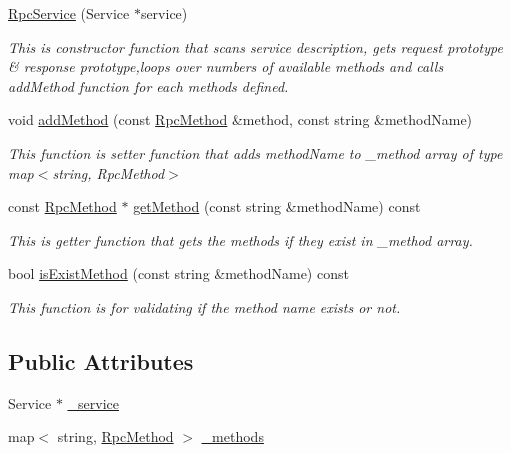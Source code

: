\begin{DoxyCompactItemize}
\item 
\hyperlink{classcoappbrpc_1_1RpcService_a66c75fc19a62dbf650f4dc5080d15bfa}{Rpc\+Service} (Service $\ast$service)
\begin{DoxyCompactList}\small\item\em This is constructor function that scans service description, gets request prototype \& response prototype,loops over numbers of available methods and calls add\+Method function for each methods defined. \end{DoxyCompactList}\item 
\mbox{\label{classcoappbrpc_1_1RpcService_a3cb969b5056dc0d5264552a16c1d244f}} 
void \hyperlink{classcoappbrpc_1_1RpcService_a3cb969b5056dc0d5264552a16c1d244f}{add\+Method} (const \hyperlink{classcoappbrpc_1_1RpcMethod}{Rpc\+Method} \&method, const string \&method\+Name)
\begin{DoxyCompactList}\small\item\em This function is setter function that adds method\+Name to \+\_\+method array of type map$<$string, Rpc\+Method$>$ \end{DoxyCompactList}\item 
\mbox{\label{classcoappbrpc_1_1RpcService_afdbb7a187c602fc830c5b3101e6b2e35}} 
const \hyperlink{classcoappbrpc_1_1RpcMethod}{Rpc\+Method} $\ast$ \hyperlink{classcoappbrpc_1_1RpcService_afdbb7a187c602fc830c5b3101e6b2e35}{get\+Method} (const string \&method\+Name) const
\begin{DoxyCompactList}\small\item\em This is getter function that gets the methods if they exist in \+\_\+method array. \end{DoxyCompactList}\item 
\mbox{\label{classcoappbrpc_1_1RpcService_a0c7f4041e49a3d4e0abd6eb9aad9691d}} 
bool \hyperlink{classcoappbrpc_1_1RpcService_a0c7f4041e49a3d4e0abd6eb9aad9691d}{is\+Exist\+Method} (const string \&method\+Name) const
\begin{DoxyCompactList}\small\item\em This function is for validating if the method name exists or not. \end{DoxyCompactList}\end{DoxyCompactItemize}
\subsection*{Public Attributes}
\begin{DoxyCompactItemize}
\item 
Service $\ast$ \hyperlink{classcoappbrpc_1_1RpcService_ab79621dd2a66b154352101e64f2dfefa}{\+\_\+service}
\item 
map$<$ string, \hyperlink{classcoappbrpc_1_1RpcMethod}{Rpc\+Method} $>$ \hyperlink{classcoappbrpc_1_1RpcService_a14b0b1bae1efc308e1c61d7737b7c4ac}{\+\_\+methods}
\end{DoxyCompactItemize}


